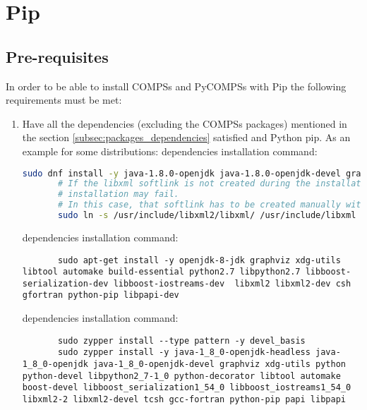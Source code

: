 \section{Pip}
\label{sec:Pip}

\subsection{Pre-requisites}
\label{subsec:pip_prerequisites}
In order to be able to install COMPSs and PyCOMPSs with Pip the following requirements must be met:
\begin{enumerate}
 \item Have all the dependencies (excluding the COMPSs packages) mentioned in the section \ref{subsec:packages_dependencies} satisfied and Python pip.
 As an example for some distributions:
    dependencies installation command:
     \begin{lstlisting}[language=bash]
       sudo dnf install -y java-1.8.0-openjdk java-1.8.0-openjdk-devel graphviz xdg-utils libtool automake python python-libs python-pip python-devel python2-decorator boost-devel boost-serialization boost-iostreams libxml2 libxml2-devel gcc gcc-c++ gcc-gfortran tcsh @development-tools redhat-rpm-config papi
       # If the libxml softlink is not created during the installation of libxml2, the COMPSs
       # installation may fail.
       # In this case, that softlink has to be created manually with the following command:
       sudo ln -s /usr/include/libxml2/libxml/ /usr/include/libxml
     \end{lstlisting}
    dependencies installation command:
     \begin{lstlisting}
       sudo apt-get install -y openjdk-8-jdk graphviz xdg-utils libtool automake build-essential python2.7 libpython2.7 libboost-serialization-dev libboost-iostreams-dev  libxml2 libxml2-dev csh gfortran python-pip libpapi-dev
     \end{lstlisting}
    dependencies installation command:
     \begin{lstlisting}
       sudo zypper install --type pattern -y devel_basis
       sudo zypper install -y java-1_8_0-openjdk-headless java-1_8_0-openjdk java-1_8_0-openjdk-devel graphviz xdg-utils python python-devel libpython2_7-1_0 python-decorator libtool automake  boost-devel libboost_serialization1_54_0 libboost_iostreams1_54_0  libxml2-2 libxml2-devel tcsh gcc-fortran python-pip papi libpapi
     \end{lstlisting}

\end{enumerate}
